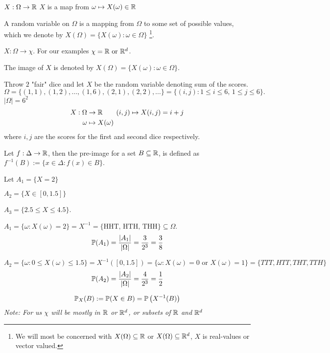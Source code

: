 \documentclass[10pt, a4paper]{article}
\begin{document}
$X : \Omega \rightarrow \R$
$X$ is a map from $\omega \mapsto X(\omega) \in \R$

\begin{definition}
    A random variable on $\Omega$ is a mapping from $\Omega$ to some set of possible values,
    which we denote by $X(\Omega) = \{X(\omega) : \omega \in \Omega\}$
    \footnote{We will most be concerned with $X(\Omega) \subseteq \R$ or $X(\Omega) \subseteq \R ^ d$, $X$ is real-values or vector valued.}.
\end{definition}

$X : \Omega \rightarrow \chi$.
For our examples
$\chi = \R \text{ or } \R ^ d$.

The image of $X$ is denoted by $X(\Omega) = \{X(\omega) : \omega \in \Omega\}$.
\begin{example}
    Throw $2$ "fair" dice and let $X$ be the random variable denoting sum of the scores.
    \[
    \Omega = \{(1, 1), (1, 2), \dotsc, (1, 6), (2, 1), (2, 2), \dotsc\} = \{(i, j) : 1 \leq i \leq 6,\, 1 \leq j \leq 6\}.
    \]
    $|\Omega| = 6 ^ 2$
    \begin{align*}
        X : \Omega &\rightarrow \R\qquad (i, j) \mapsto X(i, j) = i + j \\
        \omega &\mapsto X(\omega)
    \end{align*}
    where $i, j$ are the scores for the first and second dice respectively.
\end{example}

Let $f : \Delta \rightarrow\R$, then the pre-image for a set $B \subseteq \R$,
is defined as $f ^ {-1}(B) := \{x \in \Delta : f(x) \in B\}$.

\begin{example}[continues = exmp1]
    Let $A_1 = \{X = 2\}$
    
    $A_2 = \{X \in [0, 1.5]\}$
    
    $A_3 = \{2.5 \leq X \leq 4.5\}$.

    $A_1 = \{\omega : X(\omega) = 2\} = X ^ {-1} = \{\text{HHT, HTH, THH}\} \subseteq \Omega$.
    \[
    \P(A_1) = \frac{|A_1|}{|\Omega|} = \frac{3}{2 ^ 3} = \frac{3}{8}
    \]

    $A_2 = \{\omega : 0 \leq X(\omega) \leq 1.5\} = X ^ {-1}([0, 1.5]) = \{\omega : X(\omega) = 0\text{ or }X(\omega) = 1\} = \{TTT, HTT, THT, TTH\}$
    \[
    \P(A_2) = \frac{|A_2|}{|\Omega|} = \frac{4}{2 ^ 3} = \frac{1}{2}
    \]
\end{example}
\[
\P_X(B) := \P(X \in B) = \P\left(X ^ {-1}(B)\right)
\]
\textit{Note: For us $\chi$ will be mostly in $\R$ or $\R ^ d$, or subsets of $\R$ and $\R ^ d$}
\end{document}
